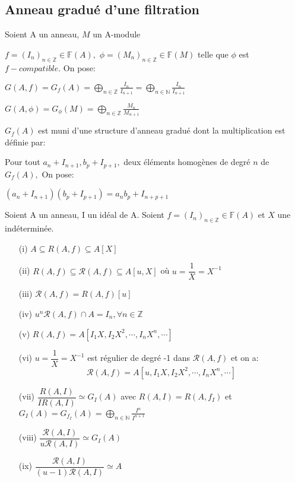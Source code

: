 \subsection{Anneau gradué d'une filtration}
\begin{madefinition}
	Soient A un anneau, $M$ un A-module
	
	$f=(I_{n})_{n\in \mathbb{Z}}\in \mathbb{F}(A),$ $\phi =(M_{n})_{n\in \mathbb{Z}}\in \mathbb{F}(M)$ telle que $\phi $ est $f-compatible$. On pose:
	
	$G(A,f)= G_{f}(A)=\displaystyle \bigoplus_{n \in \mathbb{Z}}{\frac{I_{n}}{I_{n+1}}} = \displaystyle \bigoplus_{n \in \mathbb{N}}{\frac{I_{n}}{I_{n+1}}} $
	
	$G(A, \phi)=G_{\phi }(M)=\displaystyle \bigoplus_{n \in \mathbb{Z}}{\frac{M_{n}}{M_{n+1}}}$
	
	$G_{f}(A)$ est muni d'une structure d'anneau gradué dont la
	multiplication est définie par:
	
	Pour tout $a_{n}+I_{n+1},b_{p}+I_{p+1},$ deux éléments homogènes de degré $n$
	de $G_{f}(A),$ On pose:
	
	$(a_{n}+I_{n+1})(b_{p}+I_{p+1})=a_{n}b_{p}+I_{n+p+1}$
\end{madefinition}
\begin{maproposition}
	Soient A un anneau, I un idéal de A. Soient $f = (I_n)_{n \in \mathbb{Z}} \in \mathbb{F}(A)$ et $X$ une indéterminée.
	\begin{enumerate}
		\item[(i)] $A \subseteq R(A,f) \subseteq A[X]$
		\item[(ii)] $R(A,f) \subseteq \mathcal{R}(A,f) \subseteq A[u,X]$ où $u = \dfrac{1}{X} = X^{-1}$
		\item[(iii)] $\mathcal{R}(A,f) = R(A,f)[u] $
		\item[(iv)] $u^n\mathcal{R}(A,f) \cap  A = I_n, \forall n \in \mathbb{Z}$
		\item[(v)] $R(A,f) = A[I_1X,I_2X^2, \cdots, I_nX^n, \cdots] $
		\item[(vi)] $u=\dfrac{1}{X} = X ^{-1}$ est régulier de degré -1 dans $\mathcal{R}(A,f)$ et on a: \[ \mathcal{R}(A,f) = A[u,I_1X,I_2X^2, \cdots, I_nX^n, \cdots ] \]
		\item[(vii)] $ \dfrac{R(A,I)}{IR(A,I)} \simeq G_I(A) $ avec $R(A,I) = R(A, f_I) $ et $G_I(A) = G_{f_{I}}(A) = \displaystyle \bigoplus_{n \in \mathbb{N}}{\frac{I^{n}}{I^{n+1}}} $
		\item[(viii)] $ \dfrac{\mathcal{R}(A,I)}{u\mathcal{R}(A,I)} \simeq G_I(A) $
		\item[(ix)] $ \dfrac{\mathcal{R}(A,I)}{(u-1)\mathcal{R}(A,I)} \simeq A $
	\end{enumerate} 
\end{maproposition}
